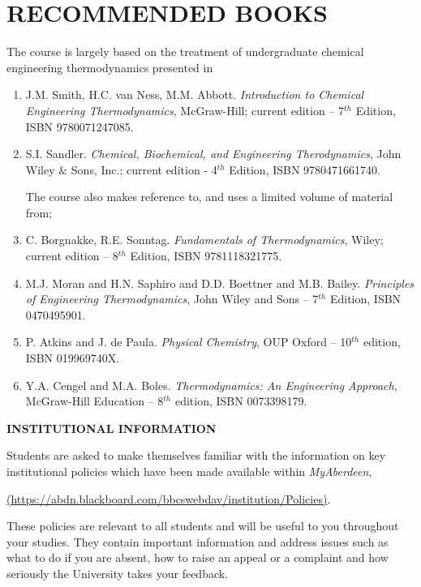 \documentclass[12pts,a4paper,amsmath,amssymb,floatfix]{article}%
\begin{document}
\section{RECOMMENDED BOOKS}
The course is largely based on the treatment of undergraduate chemical engineering thermodynamics presented in
\begin{enumerate}[1.]
\item J.M. Smith, H.C. van Ness, M.M. Abbott. {\it Introduction to Chemical Engineering Thermodynamics}, McGraw-Hill; current edition – 7$^{th}$ Edition, ISBN 9780071247085.
\item  S.I. Sandler. {\it Chemical, Biochemical, and Engineering Therodynamics}, John Wiley $\&$ Sons, Inc.; current edition - 4$^{th}$ Edition, ISBN 9780471661740.
\medskip

The course also makes reference to, and uses a limited volume of material from;

\medskip

\item C. Borgnakke, R.E. Sonntag. {\it Fundamentals of Thermodynamics}, Wiley; current edition – 8$^{th}$ Edition, ISBN 9781118321775.
\item M.J. Moran and H.N. Saphiro and D.D. Boettner and M.B. Bailey. {\it Principles of Engineering Thermodynamics}, John Wiley and Sons – 7$^{th}$ Edition, ISBN 0470495901.
\item P. Atkins and J. de Paula. {\it Physical Chemistry}, OUP Oxford -- 10$^{th}$ edition, ISBN 019969740X.
\item Y.A. Cengel and M.A. Boles. {\it Thermodynamics: An Engineering Approach}, McGraw-Hill Education -- 8$^{th}$ edition, ISBN 0073398179.
\end{enumerate}


\bigskip

{\large {\bf INSTITUTIONAL INFORMATION}}

Students are asked to make themselves familiar with the information on key institutional policies which have been made available within {\it MyAberdeen},
\begin{center}
\href{https://abdn.blackboard.com/bbcswebdav/institution/Policies}{(https://abdn.blackboard.com/bbcswebdav/institution/Policies)}.
\end{center}
These policies are relevant to all students and will be useful to you throughout your studies. They contain important information and address issues such as what to do if you are absent, how to raise an appeal or a complaint and how seriously the University takes your feedback. 
\medskip
\end{document}
